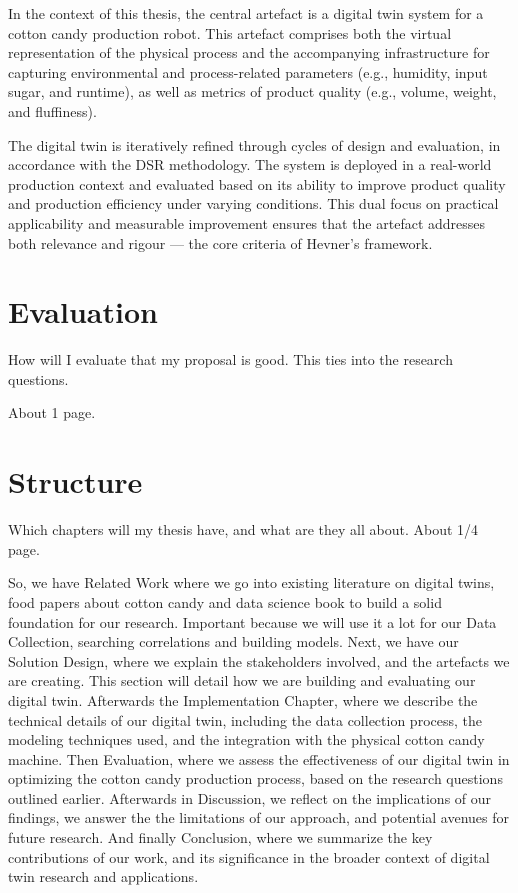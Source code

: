 In the context of this thesis, the central artefact is a digital twin system for a cotton candy production robot. This artefact comprises both the virtual representation of the physical process and the accompanying infrastructure for capturing environmental and process-related parameters (e.g., humidity, input sugar, and runtime), as well as metrics of product quality (e.g., volume, weight, and fluffiness).

The digital twin is iteratively refined through cycles of design and evaluation, in accordance with the DSR methodology. The system is deployed in a real-world production context and evaluated based on its ability to improve product quality and production efficiency under varying conditions. This dual focus on practical applicability and measurable improvement ensures that the artefact addresses both relevance and rigour — the core criteria of Hevner’s framework.

\section{Evaluation}
\label{sec:intro:ev}

How will I evaluate that my proposal is good. This ties into the research questions.

About 1 page.

\section{Structure}
\label{sec:intro:struct}

Which chapters will my thesis have, and what are they all about.
About 1/4 page.

So, we have Related Work where we go into existing literature on digital twins, food papers about cotton candy and data science book to build a solid foundation for our research. Important because we will use it a lot for our Data Collection, searching correlations and building models.
Next, we have our Solution Design, where we explain the stakeholders involved, and the artefacts we are creating. This section will detail how we are building and evaluating our digital twin. 
Afterwards the Implementation Chapter, where we describe the technical details of our digital twin, including the data collection process, the modeling techniques used, and the integration with the physical cotton candy machine.
Then Evaluation, where we assess the effectiveness of our digital twin in optimizing the cotton candy production process, based on the research questions outlined earlier.
Afterwards in Discussion, we reflect on the implications of our findings, we answer the  the limitations of our approach, and potential avenues for future research.
And finally Conclusion, where we summarize the key contributions of our work, and its significance in the broader context of digital twin research and applications.
